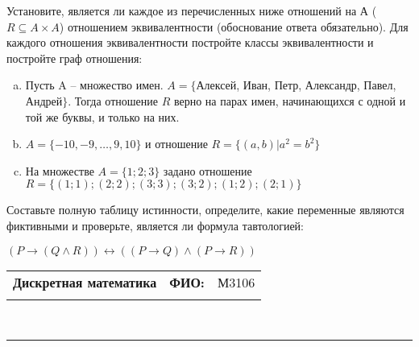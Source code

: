 \documentclass[10pt]{exam}
\newcommand{\class}{Дискретная математика}
\newcommand{\examdate}{}
\begin{document}
\begin{questions}
\question
Установите, является ли каждое из перечисленных ниже отношений на А ($R \subseteq A \times A$) отношением эквивалентности (обоснование ответа обязательно). Для каждого отношения эквивалентности постройте классы 
эквивалентности и постройте граф отношения:
\begin{enumerate} [a)]\setcounter{enumi}{0}
\item Пусть A – множество имен. $A = \{ $Алексей, Иван, Петр, Александр, Павел, Андрей$ \}$. Тогда отношение $R$ верно на парах имен, начинающихся с одной и той же буквы, и только на них.
\item $A = \{-10, -9, … , 9, 10\}$ и отношение $ R = \{(a,b)|a^{2} = b^{2}\}$
\item На множестве $A = \{1; 2; 3\}$ задано отношение $R = \{(1; 1); (2; 2); (3; 3); (3; 2); (1; 2); (2; 1)\}$
\end{enumerate}\question Составьте полную таблицу истинности, определите, какие переменные являются фиктивными и проверьте, является ли формула тавтологией:

$(P \rightarrow (Q \land R)) \leftrightarrow ((P \rightarrow Q) \land (P \rightarrow R))$

\end{questions}
\newpage
\begin{flushright}
\begin{tabular}{p{2.8in} r l}
\textbf{\class} & \textbf{ФИО:} &М3106
\\

\textbf{\examdate} &&\\
\end{tabular}\\
\end{flushright}
\rule[1ex]{\textwidth}{.1pt}
\end{document}

